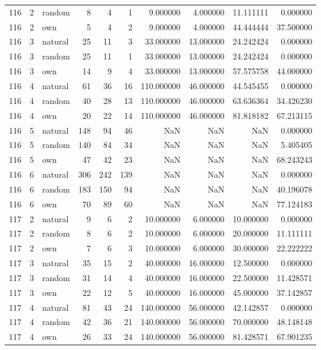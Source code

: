 \begin{table}[htbp]
\begin{tabular}{rrlrrrrrrr}
116 & 2 & random & 8 & 4 & 1 & 9.000000 & 4.000000 & 11.111111 & 0.000000 \\
116 & 2 & own & 5 & 4 & 2 & 9.000000 & 4.000000 & 44.444444 & 37.500000 \\
116 & 3 & natural & 25 & 11 & 3 & 33.000000 & 13.000000 & 24.242424 & 0.000000 \\
116 & 3 & random & 25 & 11 & 1 & 33.000000 & 13.000000 & 24.242424 & 0.000000 \\
116 & 3 & own & 14 & 9 & 4 & 33.000000 & 13.000000 & 57.575758 & 44.000000 \\
116 & 4 & natural & 61 & 36 & 16 & 110.000000 & 46.000000 & 44.545455 & 0.000000 \\
116 & 4 & random & 40 & 28 & 13 & 110.000000 & 46.000000 & 63.636364 & 34.426230 \\
116 & 4 & own & 20 & 22 & 14 & 110.000000 & 46.000000 & 81.818182 & 67.213115 \\
116 & 5 & natural & 148 & 94 & 46 & NaN & NaN & NaN & 0.000000 \\
116 & 5 & random & 140 & 84 & 34 & NaN & NaN & NaN & 5.405405 \\
116 & 5 & own & 47 & 42 & 23 & NaN & NaN & NaN & 68.243243 \\
116 & 6 & natural & 306 & 242 & 139 & NaN & NaN & NaN & 0.000000 \\
116 & 6 & random & 183 & 150 & 94 & NaN & NaN & NaN & 40.196078 \\
116 & 6 & own & 70 & 89 & 60 & NaN & NaN & NaN & 77.124183 \\
117 & 2 & natural & 9 & 6 & 2 & 10.000000 & 6.000000 & 10.000000 & 0.000000 \\
117 & 2 & random & 8 & 6 & 2 & 10.000000 & 6.000000 & 20.000000 & 11.111111 \\
117 & 2 & own & 7 & 6 & 3 & 10.000000 & 6.000000 & 30.000000 & 22.222222 \\
117 & 3 & natural & 35 & 15 & 2 & 40.000000 & 16.000000 & 12.500000 & 0.000000 \\
117 & 3 & random & 31 & 14 & 4 & 40.000000 & 16.000000 & 22.500000 & 11.428571 \\
117 & 3 & own & 22 & 12 & 5 & 40.000000 & 16.000000 & 45.000000 & 37.142857 \\
117 & 4 & natural & 81 & 43 & 24 & 140.000000 & 56.000000 & 42.142857 & 0.000000 \\
117 & 4 & random & 42 & 36 & 21 & 140.000000 & 56.000000 & 70.000000 & 48.148148 \\
117 & 4 & own & 26 & 33 & 24 & 140.000000 & 56.000000 & 81.428571 & 67.901235 \\

\end{tabular}
\end{table}
